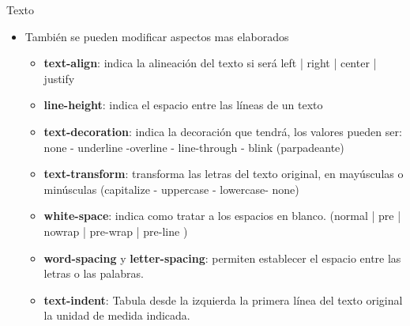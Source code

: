 \documentclass[aspectratio=43,10pt,t]{beamer}
\begin{document}
\begin{frame}{Texto}\relax
\begingroup
{}
\begin{itemize}
  \item\relax También se pueden modificar aspectos mas elaborados
  \begin{itemize}
    \item\relax \textbf{text-align}: indica la alineación del texto si será left | right | center | justify
    \item\relax \textbf{line-height}: indica el espacio entre las líneas de un texto
    \item\relax \textbf{text-decoration}: indica la decoración que tendrá, los valores pueden ser: none - underline -overline - line-through - blink (parpadeante)
    \item\relax \textbf{text-transform}: transforma las letras del texto original, en mayúsculas o minúsculas (capitalize - uppercase - lowercase- none)
    \item\relax \textbf{white-space}: indica como tratar a los espacios en blanco. (normal | pre | nowrap | pre-wrap | pre-line )
    \item\relax \textbf{word-spacing} y \textbf{letter-spacing}: permiten establecer el espacio entre las letras o las palabras.
    \item\relax \textbf{text-indent}: Tabula desde la izquierda la primera línea del texto original la unidad de medida indicada.
  \end{itemize}
\end{itemize}
\endgroup
{}
\end{frame}
\end{document}

